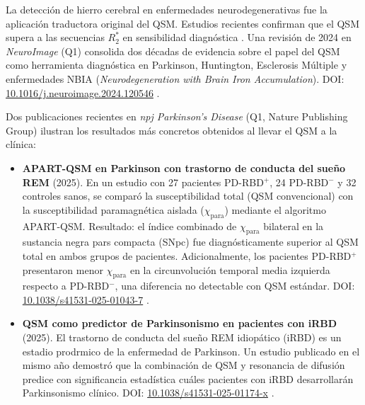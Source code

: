 \documentclass[12pt, a4paper]{article}
\begin{document}
La detección de hierro cerebral en enfermedades neurodegenerativas fue la aplicación traductora original del QSM. Estudios recientes confirman que el QSM supera a las secuencias $R_2^*$ en sensibilidad diagnóstica \cite{Langkammer2016PD, Zhang2024PDreview}. Una revisión de 2024 en \emph{NeuroImage} (Q1) consolida dos décadas de evidencia sobre el papel del QSM como herramienta diagnóstica en Parkinson, Huntington, Esclerosis Múltiple y enfermedades NBIA (\emph{Neurodegeneration with Brain Iron Accumulation}). DOI: \href{https://doi.org/10.1016/j.neuroimage.2024.120546}{10.1016/j.neuroimage.2024.120546} \cite{Zhang2024PDreview}.

Dos publicaciones recientes en \emph{npj Parkinson's Disease} (Q1, Nature Publishing Group) ilustran los resultados más concretos obtenidos al llevar el QSM a la clínica:

\begin{itemize}[leftmargin=2em, itemsep=4pt]

  \item \textbf{APART-QSM en Parkinson con trastorno de conducta del sueño REM} (2025). En un estudio con 27 pacientes PD-RBD$^+$, 24 PD-RBD$^-$ y 32 controles sanos, se comparó la susceptibilidad total (QSM convencional) con la susceptibilidad paramagnética aislada ($\chi_\text{para}$) mediante el algoritmo APART-QSM. Resultado: el índice combinado de $\chi_\text{para}$ bilateral en la sustancia negra pars compacta (SNpc) fue diagnósticamente superior al QSM total en ambos grupos de pacientes. Adicionalmente, los pacientes PD-RBD$^+$ presentaron menor $\chi_\text{para}$ en la circunvolución temporal media izquierda respecto a PD-RBD$^-$, una diferencia no detectable con QSM estándar. DOI: \href{https://doi.org/10.1038/s41531-025-01043-7}{10.1038/s41531-025-01043-7} \cite{APARTPD2025}.

  \item \textbf{QSM como predictor de Parkinsonismo en pacientes con iRBD} (2025). El trastorno de conducta del sueño REM idiopático (iRBD) es un estadio prodrmico de la enfermedad de Parkinson. Un estudio publicado en el mismo año demostró que la combinación de QSM y resonancia de difusión predice con significancia estadística cuáles pacientes con iRBD desarrollarán Parkinsonismo clínico. DOI: \href{https://doi.org/10.1038/s41531-025-01174-x}{10.1038/s41531-025-01174-x} \cite{iRBD2025}.

\end{itemize}

\end{document}
